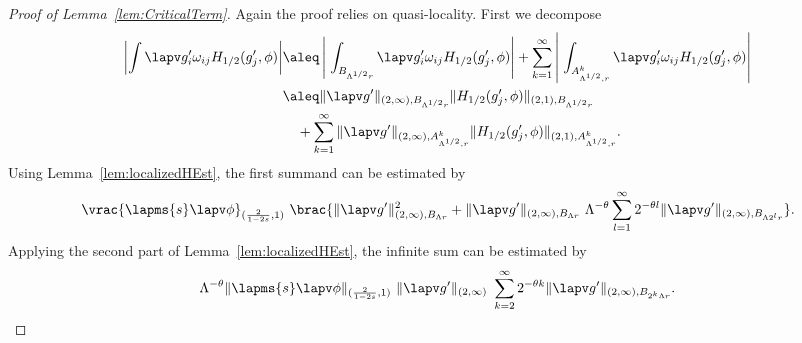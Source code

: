 \begin{proof}[Proof of Lemma~\ref{lem:CriticalTerm}]
 Again the proof relies on quasi-locality. First we decompose
 \begin{align*}
  \left|\int \lapv  g_i' \omega_{ij} H_{1/2}(g'_j,\phi) \right|
  &\aleq  \left|\; \int_{B_{\Lambda^{1/2}r}}  \lapv  g_i' \omega_{ij} H_{1/2}(g'_j,\phi) \right|
  + \sum_{k=1}^\infty \left|\;
  \int_{A^k_{\Lambda^{1/2}, r}} 
  \lapv  g_i' \omega_{ij} H_{1/2}(g'_j,\phi) \right|\\
  &\aleq \|\lapv g'\|_{(2,\infty),B_{\Lambda^{1/2}r}} 
  \|H_{1/2}(g'_j,\phi)\|_{(2,1), B_{\Lambda^{1/2}r}} \\ 
  & \quad +
  \sum_{k=1}^\infty \|\lapv  g'\|_{(2,\infty),A_{\Lambda^{1/2},r}^{k}}
  \|H_{1/2}(g'_j,\phi)\|_{(2,1),A^k_{\Lambda^{1/2},r}}   .
 \end{align*}
  Using Lemma~\ref{lem:localizedHEst},
  the first summand can be estimated by %
 \begin{align*}
 \vrac{\lapms{s}\lapv \phi}_{(\frac{2}{1-2s},1)} \ \brac{
  \|\lapv g'\|_{(2,\infty),B_{\Lambda r}}^2 +  \|\lapv g'\|_{(2,\infty),B_{\Lambda r}}\ \Lambda^{-\theta} \sum_{l=1}^\infty 2^{-\theta l} \|\lapv  g'\|_{(2,\infty),B_{\Lambda 2^lr}}
  }.
 \end{align*}
 Applying the second part of Lemma~\ref{lem:localizedHEst}, the infinite sum can be estimated by
 \[ \Lambda^{-\theta}\| \lapms{s}  \lapv \phi\|_{(\frac 2 {1-2 s},1)}\ \|\lapv g'\|_{(2,\infty)} \ \sum_{k=2}^\infty 
  2^{-\theta k} \|\lapv  g'\|_{(2,\infty),B_{2^k\Lambda r}}.\]
\end{proof}

